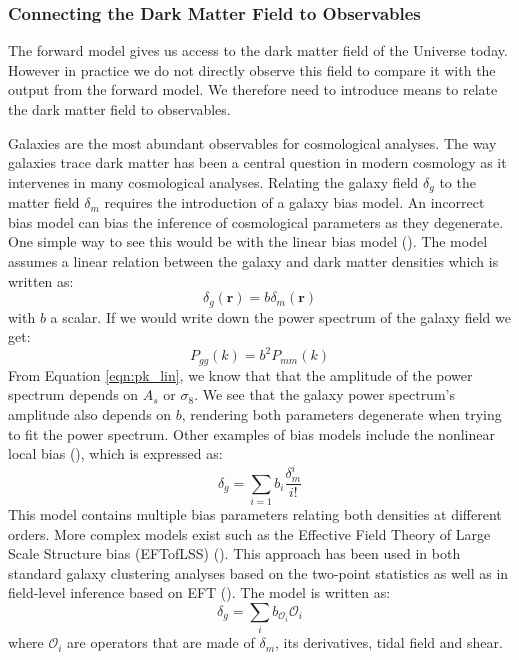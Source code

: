 \subsubsection{Connecting the Dark Matter Field to Observables} \label{sec:observable_to_dm}

The forward model gives us access to the dark matter field of the Universe today. 
However in practice we do not directly observe this field to compare it with the output from the forward model. 
We therefore need to introduce means to relate the dark matter field to observables.

Galaxies are the most abundant observables for cosmological analyses. The way galaxies trace dark matter has been a central question in modern cosmology as it intervenes 
in many cosmological analyses. Relating the galaxy field $\delta_g$ to the matter field $\delta_m$ requires the introduction of a galaxy bias model. 
An incorrect bias model can bias the inference of cosmological parameters as they degenerate. One simple way 
to see this would be with the linear bias model (\cite{Kaiser_1984}). The model assumes a linear relation between the galaxy and dark matter densities which is written as:
\begin{equation}
    \delta_g(\mathbf{r}) = b \delta_m(\mathbf{r})
\end{equation}
with $b$ a scalar. If we would write down the power spectrum of the galaxy field we get:
\begin{equation}
    P_{gg}(k) = b^2 P_{mm}(k)
\end{equation}
From Equation \ref{eqn:pk_lin}, we know that that the amplitude of the power spectrum depends on $A_s$ or $\sigma_8$. We see that the galaxy power spectrum's amplitude also 
depends on $b$, rendering both parameters degenerate when trying to fit the power spectrum. Other examples of bias models include the 
nonlinear local bias (\cite{Fry_1993}), which is expressed as:
\begin{equation}
    \delta_g = \sum_{i=1} b_i \frac{\delta_m^i}{i!}
\end{equation}
This model contains multiple bias parameters relating both densities at different orders. 
More complex models exist such as the Effective Field Theory of Large Scale Structure bias (EFTofLSS) (\cite{Mirbabayi_2015}). 
This approach has been used in both standard galaxy clustering analyses based on the two-point statistics as well as in field-level inference based on EFT (\cite{Schmidt_2021}).
The model is written as:
\begin{equation}
    \delta_g = \sum_i b_{\mathcal{O}_i}\mathcal{O}_i
\end{equation}
where $\mathcal{O}_i$ are operators that are made of $\delta_m$, its derivatives, tidal field and shear. 

